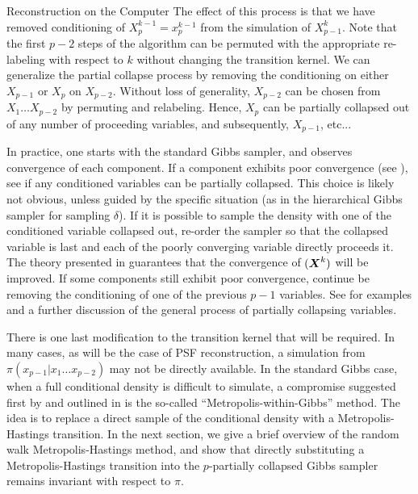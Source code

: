 \begin{chapter}{Reconstruction on the Computer}
The effect of this process is that we have removed conditioning of $X_p^{k-1} = x_p^{k-1}$ from the simulation of $X^k_{p-1}$. 
Note that the first $p-2$ steps of the algorithm can be permuted with the appropriate re-labeling with respect to $k$ without changing the transition kernel.
We can generalize the partial collapse process by removing the conditioning on either $X_{p-1}$ or $X_p$ on $X_{p-2}$.
Without loss of generality, $X_{p-2}$ can be chosen from $X_1\dots X_{p-2}$ by permuting and relabeling.
Hence, $X_p$ can be partially collapsed out of any number of proceeding variables, and subsequently, $X_{p-1}$, etc...

In practice, one starts with the standard Gibbs sampler, and observes convergence of each component.
If a component exhibits poor convergence (see ), see if any conditioned variables can be partially collapsed.
This choice is likely not obvious, unless guided by the specific situation (as in the hierarchical Gibbs sampler for sampling $\delta$).
If it is possible to sample the density with one of the conditioned variable collapsed out, re-order the sampler so that the collapsed variable is last and each of the poorly converging variable directly proceeds it. 
The theory presented in \citep{van2008partially} guarantees that the convergence of $(\mbox{\boldmath$X$}^k)$ will be improved.
If some components still exhibit poor convergence, continue be removing the conditioning of one of the previous $p-1$ variables.
See \citep{van2008partially} for examples and a further discussion of the general process of partially collapsing variables.

There is one last modification to the transition kernel that will be required.
In many cases, as will be the case of PSF reconstruction, a simulation from $\pi(x_{p-1}|x_1\dots x_{p-2})$ may not be directly available.
In the standard Gibbs case, when a full conditional density is difficult to simulate, a compromise suggested first by \citep{muller1992alternatives} and outlined in \citep{robert2013monte} is the so-called ``Metropolis-within-Gibbs'' method.
The idea is to replace a direct sample of the conditional density with a Metropolis-Hastings transition. 
In the next section, we give a brief overview of the random walk Metropolis-Hastings method, and show that directly substituting a Metropolis-Hastings transition into the $p$-partially collapsed Gibbs sampler remains invariant with respect to $\pi$.


\end{chapter}
